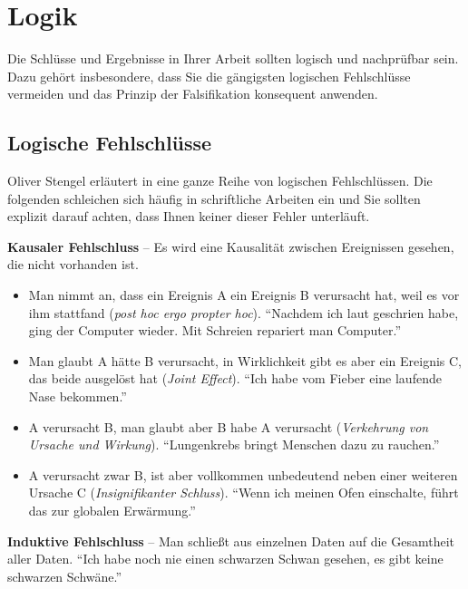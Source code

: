 \documentclass[a4paper,11pt,headings=normal]{scrartcl}
\begin{document}
\section{Logik}

Die Schlüsse und Ergebnisse in Ihrer Arbeit sollten logisch und nachprüfbar sein. Dazu gehört insbesondere, dass Sie die gängigsten logischen Fehlschlüsse vermeiden und das Prinzip der Falsifikation konsequent anwenden.

\subsection{Logische Fehlschlüsse}
Oliver Stengel erläutert in \autocite{Stengel2005} eine ganze Reihe von logischen Fehlschlüssen. Die folgenden schleichen sich häufig in schriftliche Arbeiten ein und Sie sollten explizit darauf achten, dass Ihnen keiner dieser Fehler unterläuft.

\vspace{0.3cm}\noindent\textbf{Kausaler Fehlschluss} -- Es wird eine Kausalität zwischen Ereignissen gesehen, die nicht vorhanden ist.
  \begin{itemize}
     \item Man nimmt an, dass ein Ereignis A ein Ereignis B verursacht hat, weil es vor ihm stattfand (\textit{post hoc ergo propter hoc}). "`Nachdem ich laut geschrien habe, ging der Computer wieder. Mit Schreien repariert man Computer."'
     \item Man glaubt A hätte B verursacht, in Wirklichkeit gibt es aber ein Ereignis C, das beide ausgelöst hat (\textit{Joint Effect}). "`Ich habe vom Fieber eine laufende Nase bekommen."'
     \item A verursacht B, man glaubt aber B habe A verursacht (\textit{Verkehrung von Ursache und Wirkung}). "`Lungenkrebs bringt Menschen dazu zu rauchen."'
     \item A verursacht zwar B, ist aber vollkommen unbedeutend neben einer weiteren Ursache C (\textit{Insignifikanter Schluss}). "`Wenn ich meinen Ofen einschalte, führt das zur globalen Erwärmung."'
  \end{itemize}

\vspace{0.3cm}\noindent\textbf{Induktive Fehlschluss} -- Man schließt aus einzelnen Daten auf die Gesamtheit aller Daten. "`Ich habe noch nie einen schwarzen Schwan gesehen, es gibt keine schwarzen Schwäne."'
\end{document}
